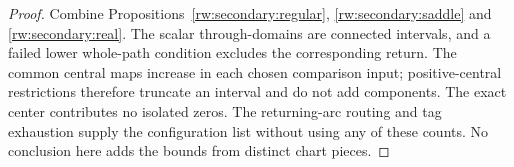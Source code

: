 \begin{proof}
Combine Propositions~\ref{rw:secondary:regular},
\ref{rw:secondary:saddle} and \ref{rw:secondary:real}.
The scalar through-domains are connected intervals, and a failed lower
whole-path condition excludes the corresponding return.
The common central maps increase in each chosen comparison input;
positive-central restrictions therefore truncate an interval and do
not add components. The exact center contributes no isolated zeros.
The returning-arc routing and tag exhaustion supply the configuration
list without using any of these counts. No conclusion here adds
the bounds from distinct chart pieces.
\end{proof}
